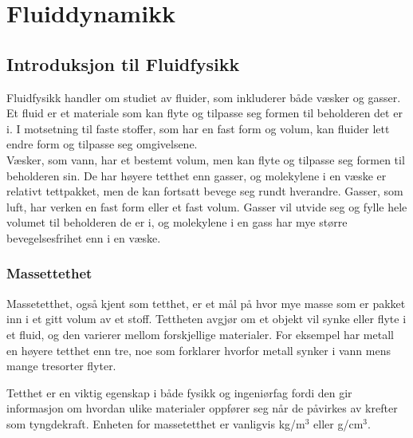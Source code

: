 \chapter{Fluiddynamikk}

\newpage

\section{Introduksjon til Fluidfysikk}

Fluidfysikk handler om studiet av fluider, som inkluderer både væsker og gasser. Et fluid er et materiale som kan flyte og tilpasse seg formen til beholderen det er i. I motsetning til faste stoffer, som har en fast form og volum, kan fluider lett endre form og tilpasse seg omgivelsene.\\

Væsker, som vann, har et bestemt volum, men kan flyte og tilpasse seg formen til beholderen sin. De har høyere tetthet enn gasser, og molekylene i en væske er relativt tettpakket, men de kan fortsatt bevege seg rundt hverandre. Gasser, som luft, har verken en fast form eller et fast volum. Gasser vil utvide seg og fylle hele volumet til beholderen de er i, og molekylene i en gass har mye større bevegelsesfrihet enn i en væske.

\subsection{Massettethet}

Massetetthet, også kjent som tetthet, er et mål på hvor mye masse som er pakket inn i et gitt volum av et stoff. Tettheten avgjør om et objekt vil synke eller flyte i et fluid, og den varierer mellom forskjellige materialer. For eksempel har metall en høyere tetthet enn tre, noe som forklarer hvorfor metall synker i vann mens mange tresorter flyter.

Tetthet er en viktig egenskap i både fysikk og ingeniørfag fordi den gir informasjon om hvordan ulike materialer oppfører seg når de påvirkes av krefter som tyngdekraft. Enheten for massetetthet er vanligvis kg/m\(^3\) eller g/cm\(^3\).



